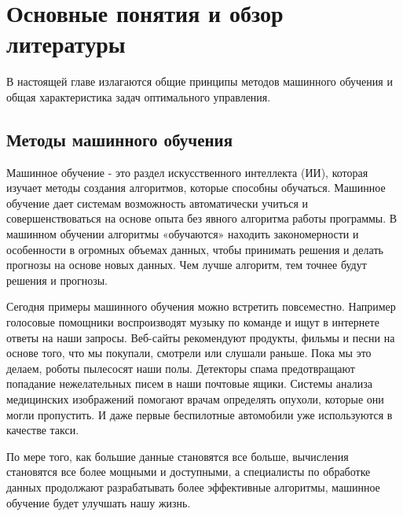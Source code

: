 \chapter{Основные понятия и обзор литературы}\label{chap1}

В настоящей главе излагаются общие принципы методов машинного обучения и общая характеристика задач оптимального управления. 


\section{Методы машинного обучения}\label{1sec:machine-learning}

Машинное обучение - это раздел искусственного интеллекта (ИИ), которая изучает методы создания алгоритмов, которые способны обучаться. Машинное обучение дает системам возможность автоматически учиться и совершенствоваться на основе опыта без явного алгоритма работы программы. В машинном обучении алгоритмы «обучаются» находить закономерности и особенности в огромных объемах данных, чтобы принимать решения и делать прогнозы на основе новых данных. Чем лучше алгоритм, тем точнее будут решения и прогнозы. 

Сегодня примеры машинного обучения можно встретить повсеместно. Например голосовые помощники воспроизводят музыку  по команде и ищут в интернете ответы на наши запросы. Веб-сайты рекомендуют продукты, фильмы и песни на основе того, что мы покупали, смотрели или слушали раньше. Пока мы это делаем, роботы пылесосят наши полы. Детекторы спама предотвращают попадание нежелательных писем в наши почтовые ящики. Системы анализа медицинских изображений помогают врачам определять опухоли, которые они могли пропустить. И даже первые беспилотные автомобили уже используются в качестве такси.

По мере того, как большие данные становятся все больше, вычисления становятся все более мощными и доступными, а специалисты по обработке данных продолжают разрабатывать более эффективные алгоритмы, машинное обучение будет улучшать нашу жизнь. 

